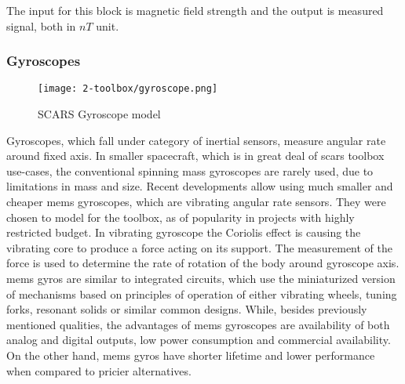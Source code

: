         The input for this block is magnetic field strength and the output is measured signal, both in $nT$ unit.


    \subsubsection{Gyroscopes}

        \begin{figure}[H]
            \centering
            \texttt{[image: 2-toolbox/gyroscope.png]}
            \caption{SCARS Gyroscope model}
            \label{fig:gryo_simulink}
        \end{figure}

        Gyroscopes, which fall under category of inertial sensors, measure angular rate around fixed axis. In smaller spacecraft, which is in great deal of \ac{scars} toolbox use-cases, the conventional spinning mass gyroscopes are rarely used, due to limitations in mass and size. Recent developments allow using much smaller and cheaper \ac{mems} gyroscopes, which are vibrating angular rate sensors. They were chosen to model for the toolbox, as of popularity in projects with highly restricted budget. \cite{armenise2010advances} In vibrating gyroscope the Coriolis effect is causing the vibrating core to produce a force acting on its support. The measurement of the force is used to determine the rate of rotation of the body around gyroscope axis. \ac{mems} gyros are similar to integrated circuits, which use the miniaturized version of mechanisms based on principles of operation of either vibrating wheels, tuning forks, resonant solids or similar common designs. \cite{bernstein2003overview} While, besides previously mentioned qualities, the advantages of \ac{mems} gyroscopes are availability of both analog and digital outputs, low power consumption and commercial availability. On the other hand, \ac{mems} gyros have shorter lifetime and lower performance when compared to pricier alternatives.


